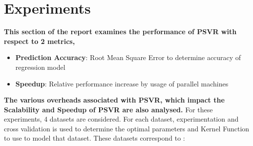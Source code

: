 \documentclass[12pt]{article}
\begin{document}
\section{Experiments}
{\bf This section of the report examines the performance of PSVR with respect to 2 metrics,}
\begin{itemize}
\item  {\bf Prediction Accuracy}: Root Mean Square Error to determine accuracy of regression model
\item {\bf Speedup}: Relative performance increase by usage of parallel machines
\end{itemize}
{\bf The various overheads associated with PSVR, which impact the Scalability and Speedup of PSVR are also analysed.}
\newline\newline
For these experiments, 4 datasets are considered. For each dataset, experimentation and cross validation is used to determine the optimal parameters and Kernel Function to use to model that dataset. These datasets correspond to : 
\end{document}
